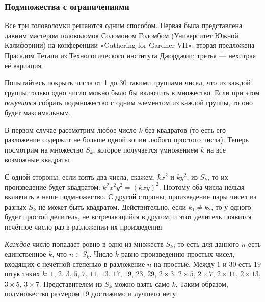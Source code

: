 %

\subsubsection*{Подмножества с ограничениями}

Все три головоломки решаются одним способом.
Первая была представлена давним мастером головоломок Соломоном Голомбом (Университет Южной Калифорнии) %
на конференции
«Ga\-the\-ring for Gard\-ner VII»;
вторая предложена Прасадом Тетали из Технологического института Джорджии;
третья --- нехитрая её вариация.

Попытайтесь покрыть числа от 1 до 30 такими группами чисел, что из каждой группы только одно число можно было бы включить в множество.
Если при этом \emph{получится} собрать подмножество с одним элементом из каждой группы, то оно будет максимальным.

В первом случае рассмотрим любое число $k$ без квадратов (то есть его разложение содержит не больше одной копии любого простого числа).
Теперь посмотрим на множество $S_k$, которое получается умножением $k$ на все возможные квадраты.

С одной стороны, если взять два числа, скажем, $kx^2$ и $ky^2$, из $S_k$, то их произведение будет квадратом: $k^2x^2y^2 = (kxy)^2$.
Поэтому оба числа нельзя включить в наше подмножество.
С другой стороны, произведение пары чисел из разных $S_k$ не может быть квадратом.
Действительно, если $k_1\ne k_2$, то у одного будет простой делитель, не встречающийся в другом, и этот делитель появится нечётное число раз в разложении их произведения.

\emph{Каждое} число попадает ровно в одно из множеств $S_k$;
то есть для данного $n$ есть единственное $k$, что $n \in S_k$.
Число $k$ равно произведению простых чисел, входящих с нечётной степенью в разложение $n$ на простые.
Между $1$ и $30$ есть $19$ штук таких $k$: $1$, $2$, $3$, $5$, $7$, $11$, $13$, $17$, $19$,
$23$, $29$, $2 \times 3$, $2 \times 5$, $2 \times 7$, $2 \times 11$, $2 \times 13$, $3 \times 5$, $3 \times 7$.
Представителем из $S_k$ можно взять само $k$.
Таким образом, подмножество размером $19$ достижимо и лучшего нету.

